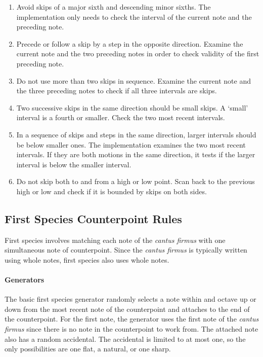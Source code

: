 	\begin{enumerate}
		
		\item Avoid skips of a major sixth and descending minor sixths. The implementation only needs to check the interval of the current note and the preceding note.

		\item Precede or follow a skip by a step in the opposite direction. Examine the current note and the two preceding notes in order to check validity of the first preceding note.

		\item Do not use more than two skips in sequence. Examine the current note and the three preceding notes to check if all three intervals are skips.

		\item Two successive skips in the same direction should be small skips. A `small' interval is a fourth or smaller. Check the two most recent intervals.

		\item In a sequence of skips and steps in the same direction, larger intervals should be below smaller ones.
          The implementation examines the two most recent intervals. If they are both motions in the same direction, it tests if the larger interval is below the smaller interval.

		\item Do not skip both to and from a high or low point. Scan back to the previous high or low and check if it is bounded by skips on both sides.

	\end{enumerate}

\subsection{First Species Counterpoint Rules}

First species involves matching each note of the \emph{cantus firmus} with one simultaneous note of counterpoint.
Since the \emph{cantus firmus} is typically written using whole notes, first species also uses whole notes.

\paragraph{Generators}
The basic first species generator randomly selects a note within and octave up or down from the most recent note of the counterpoint and attaches to the end of the counterpoint.
For the first note, the generator uses the first note of the \emph{cantus firmus} since there is no note in the counterpoint to work from.
The attached note also has a random accidental. The accidental is limited to at most one, so the only possibilities are one flat, a natural, or one sharp.

